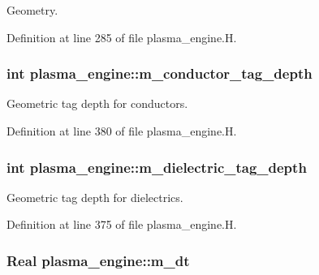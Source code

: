 Geometry. 



Definition at line 285 of file plasma\+\_\+engine.\+H.

\subsubsection[{\texorpdfstring{m\+\_\+conductor\+\_\+tag\+\_\+depth}{m_conductor_tag_depth}}]{\setlength{\rightskip}{0pt plus 5cm}int plasma\+\_\+engine\+::m\+\_\+conductor\+\_\+tag\+\_\+depth\hspace{0.3cm}{\ttfamily [protected]}}\hypertarget{classplasma__engine_a91e626546a2d136de4cbca5237cd80b2}{}\label{classplasma__engine_a91e626546a2d136de4cbca5237cd80b2}


Geometric tag depth for conductors. 



Definition at line 380 of file plasma\+\_\+engine.\+H.

\subsubsection[{\texorpdfstring{m\+\_\+dielectric\+\_\+tag\+\_\+depth}{m_dielectric_tag_depth}}]{\setlength{\rightskip}{0pt plus 5cm}int plasma\+\_\+engine\+::m\+\_\+dielectric\+\_\+tag\+\_\+depth\hspace{0.3cm}{\ttfamily [protected]}}\hypertarget{classplasma__engine_abac909f41b439212638b57c8b9508278}{}\label{classplasma__engine_abac909f41b439212638b57c8b9508278}


Geometric tag depth for dielectrics. 



Definition at line 375 of file plasma\+\_\+engine.\+H.

\subsubsection[{\texorpdfstring{m\+\_\+dt}{m_dt}}]{\setlength{\rightskip}{0pt plus 5cm}Real plasma\+\_\+engine\+::m\+\_\+dt\hspace{0.3cm}{\ttfamily [protected]}}\hypertarget{classplasma__engine_ad747d24a60aec6bc61464941358f2a5e}{}\label{classplasma__engine_ad747d24a60aec6bc61464941358f2a5e}


